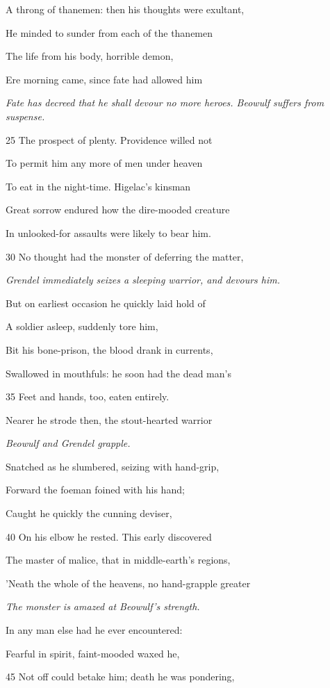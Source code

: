 A throng of thanemen: then his thoughts were exultant,

He minded to sunder from each of the thanemen

The life from his body, horrible demon,

Ere morning came, since fate had allowed him

\emph{Fate has decreed
that he shall devour
no more heroes.
Beowulf suffers
from suspense.}

25
The prospect of plenty. Providence willed not

To permit him any more of men under heaven

To eat in the night-time. Higelac’s kinsman

Great sorrow endured how the dire-mooded creature

In unlooked-for assaults were likely to bear him.

30
No thought had the monster of deferring the matter,

\emph{Grendel immediately
seizes a
sleeping warrior,
and devours him.}

But on earliest occasion he quickly laid hold of

A soldier asleep, suddenly tore him,

Bit his bone-prison, the blood drank in currents,

Swallowed in mouthfuls: he soon had the dead man’s

35
Feet and hands, too, eaten entirely.

Nearer he strode then, the stout-hearted warrior

\emph{Beowulf and Grendel
grapple.}

Snatched as he slumbered, seizing with hand-grip,

Forward the foeman foined with his hand;

Caught he quickly the cunning deviser,

40
On his elbow he rested. This early discovered

The master of malice, that in middle-earth’s regions,

’Neath the whole of the heavens, no hand-grapple greater

\emph{The monster is
amazed at Beowulf’s
strength.}

In any man else had he ever encountered:

Fearful in spirit, faint-mooded waxed he,

45
Not off could betake him; death he was pondering,

